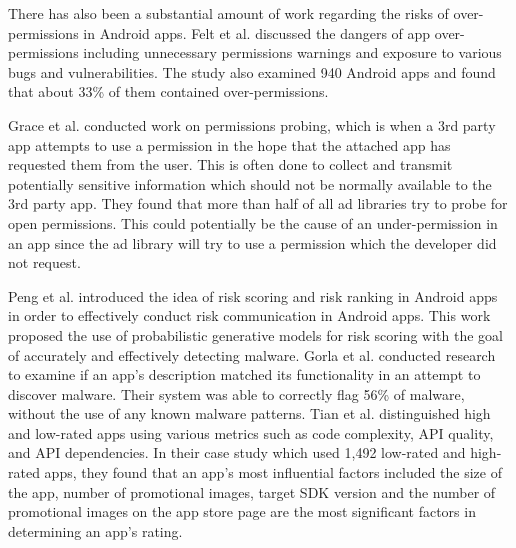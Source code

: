 \documentclass{sig-alternate-05-2015}
\newcommand{\todo}[1]{\textcolor{cyan}{\textbf{[#1]}}}
\begin{document}
There has also been a substantial amount of work regarding the risks of over-permissions in Android apps. Felt et al.\cite{Felt:2011:APD:2046707.2046779} discussed the dangers of app over-permissions including unnecessary permissions warnings and exposure to various bugs and vulnerabilities. The study also examined 940 Android apps and found that about 33\% of them contained over-permissions.


Grace et al.\cite{Grace:2012:UEA:2185448.2185464} conducted work on permissions probing, which is when a 3rd party app attempts to use a permission in the hope that the attached app has requested them from the user. This is often done to collect and transmit potentially sensitive information which should not be normally available to the 3rd party app. They found that more than half of all ad libraries try to probe for open permissions. This could potentially be the cause of an under-permission in an app since the ad library will try to use a permission which the developer did not request.








Peng et al.\cite{Peng:2012:UPG:2382196.2382224} introduced the idea of risk scoring and risk ranking in Android apps in order to effectively conduct risk communication in Android apps. This work proposed the use of probabilistic generative models for risk scoring with the goal of accurately and effectively detecting malware. Gorla et al.\cite{Gorla:2014:CAB:2568225.2568276} conducted research to examine if an app's description matched its functionality in an attempt to discover malware. Their system was able to correctly flag 56\% of malware, without the use of any known malware patterns. Tian et al.\cite{tian2015characteristics} distinguished high and low-rated apps using various metrics such as code complexity, API quality, and API dependencies. In their case study which used 1,492 low-rated and high-rated apps, they found that an app's most influential factors included the size of the app, number of promotional images, target SDK version and the number of promotional images on the app store page are the most significant factors in determining an app's rating.
\end{document}
